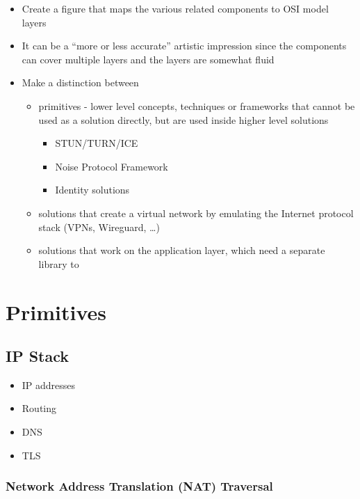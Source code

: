 \begin{itemize}
\item
  Create a figure that maps the various related components to OSI model
  layers
\item
  It can be a ``more or less accurate'' artistic impression since the
  components can cover multiple layers and the layers are somewhat fluid
\item
  Make a distinction between

  \begin{itemize}
  \tightlist
  \item
    primitives - lower level concepts, techniques or frameworks that
    cannot be used as a solution directly, but are used inside higher
    level solutions

    \begin{itemize}
    \tightlist
    \item
      STUN/TURN/ICE
    \item
      Noise Protocol Framework
    \item
      Identity solutions
    \end{itemize}
  \item
    solutions that create a virtual network by emulating the Internet
    protocol stack (VPNs, Wireguard, \ldots)
  \item
    solutions that work on the application layer, which need a separate
    library to
  \end{itemize}
\end{itemize}

\hypertarget{primitives}{%
\section{Primitives}\label{primitives}}

\hypertarget{ip-stack}{%
\subsection{IP Stack}\label{ip-stack}}

\begin{itemize}
\tightlist
\item
  IP addresses
\item
  Routing
\item
  DNS
\item
  TLS
\end{itemize}

\hypertarget{network-address-translation-nat-traversal}{%
\subsubsection{Network Address Translation (NAT)
Traversal}\label{network-address-translation-nat-traversal}}

